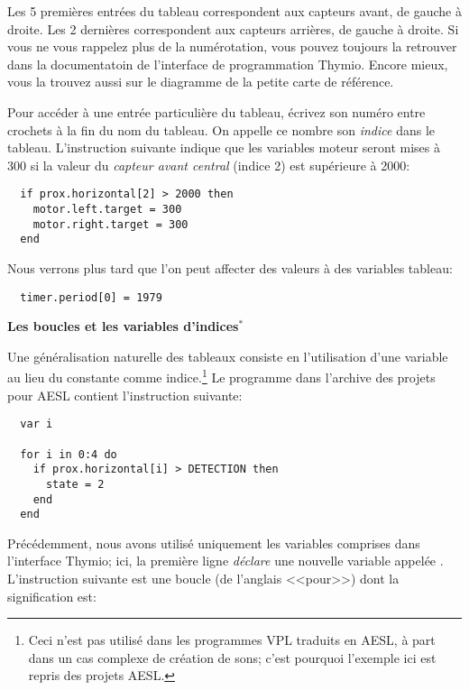Les 5 premières entrées du tableau correspondent aux capteurs avant, de gauche à droite.
Les 2 dernières correspondent aux capteurs arrières, de gauche à droite.
Si vous ne vous rappelez plus de la numérotation, vous pouvez toujours la retrouver 
dans la documentatoin de l'interface de programmation Thymio.
Encore mieux, vous la trouvez aussi sur le diagramme de la petite carte de référence.

Pour accéder à une entrée particulière du tableau, écrivez son numéro entre crochets à la fin 
du nom du tableau. On appelle ce nombre son \emph{indice} dans le tableau.
L'instruction suivante indique que les variables moteur seront mises à 300 si la valeur du \emph{capteur
avant central} (indice 2) est supérieure à 2000:

\begin{footnotesize}
\begin{verbatim}
  if prox.horizontal[2] > 2000 then
    motor.left.target = 300
    motor.right.target = 300
  end
\end{verbatim}
\end{footnotesize}

Nous verrons plus tard que l'on peut affecter des valeurs à des variables tableau:
\begin{footnotesize}
\begin{verbatim}
  timer.period[0] = 1979
\end{verbatim}
\end{footnotesize}

\textbf{\large Les boucles  et les variables d'indices$^*$}

Une généralisation naturelle des tableaux consiste en l'utilisation d'une variable au lieu du
constante comme indice.\footnote{Ceci n'est pas utilisé dans les programmes VPL traduits en AESL,
à part dans un cas complexe de création de sons; c'est pourquoi l'exemple ici est repris des projets
AESL.}
Le programme  dans l'archive des projets pour AESL contient l'instruction suivante:

\begin{footnotesize}
\begin{verbatim}
  var i

  for i in 0:4 do
    if prox.horizontal[i] > DETECTION then
      state = 2
    end
  end
\end{verbatim}
\end{footnotesize}

Précédemment, nous avons utilisé uniquement les variables comprises dans l'interface Thymio;
ici, la première ligne \emph{déclare} une nouvelle variable appelée .
L'instruction suivante est une boucle  (de l'anglais <<pour>>) dont la signification est: 

